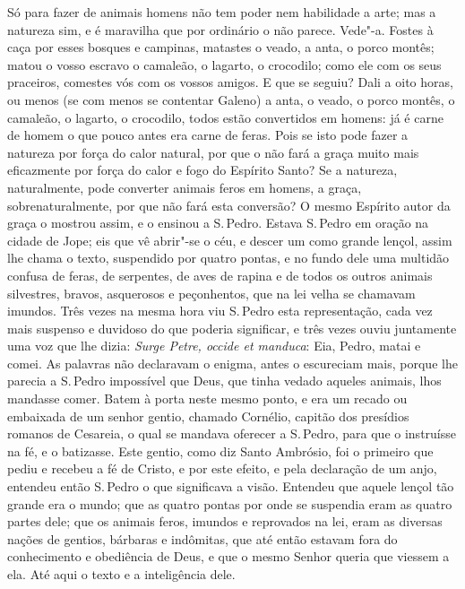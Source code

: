 Só para fazer de animais homens não tem poder nem habilidade a arte; mas
a natureza sim, e é maravilha que por ordinário o não parece. Vede"-a.
Fostes à caça por esses bosques e campinas, matastes o veado, a anta, o
porco montês; matou o vosso escravo o camaleão, o lagarto, o crocodilo;
como ele com os seus praceiros, comestes vós com os vossos amigos. E que
se seguiu? Dali a oito horas, ou menos (se com menos se contentar
Galeno) a anta, o veado, o porco montês, o camaleão, o lagarto, o
crocodilo, todos estão convertidos em homens: já é carne de homem o que
pouco antes era carne de feras. Pois se isto pode fazer a natureza por
força do calor natural, por que o não fará a graça muito mais
eficazmente por força do calor e fogo do Espírito Santo? Se a natureza,
naturalmente, pode converter animais feros em homens, a graça,
sobrenaturalmente, por que não fará esta conversão? O mesmo Espírito
autor da graça o mostrou assim, e o ensinou a S.\,Pedro. Estava S.\,Pedro
em oração na cidade de Jope; eis que vê abrir"-se o céu, e descer um como
grande lençol, assim lhe chama o texto, suspendido por quatro
pontas, e no fundo dele uma multidão confusa de feras, de serpentes, de
aves de rapina e de todos os outros animais silvestres, bravos,
asquerosos e peçonhentos, que na lei velha se chamavam imundos. Três
vezes na mesma hora viu S.\,Pedro esta representação, cada vez mais
suspenso e duvidoso do que poderia significar, e três vezes ouviu
juntamente uma voz que lhe dizia: \emph{Surge Petre, occide et manduca}:%
 Eia, Pedro, matai e comei. As palavras não declaravam
o enigma, antes o escureciam mais, porque lhe parecia a S.\,Pedro
impossível que Deus, que tinha vedado aqueles animais, lhos mandasse
comer. Batem à porta neste mesmo ponto, e era um recado ou embaixada de
um senhor gentio, chamado Cornélio, capitão dos presídios romanos de
Cesareia, o qual se mandava oferecer a S.\,Pedro, para que o instruísse
na fé, e o batizasse. Este gentio, como diz Santo Ambrósio, foi o
primeiro que pediu e recebeu a fé de Cristo, e por este efeito, e pela
declaração de um anjo, entendeu então S.\,Pedro o que significava a
visão. Entendeu que aquele lençol tão grande era o mundo; que as quatro
pontas por onde se suspendia eram as quatro partes dele; que os animais
feros, imundos e reprovados na lei, eram as diversas nações de gentios,
bárbaras e indômitas, que até então estavam fora do conhecimento e
obediência de Deus, e que o mesmo Senhor queria que viessem a ela. Até
aqui o texto e a inteligência dele.

